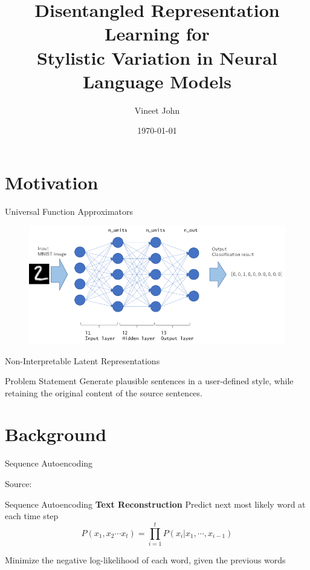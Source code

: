 \documentclass[aspectratio=169]{beamer}
\title{
    Disentangled Representation Learning for \\
    Stylistic Variation in Neural Language Models}
\date{\today}
\author{Vineet John}
\institute{University of Waterloo}
\begin{document}
\maketitle

\graphicspath{{images/}}

\section{Motivation}

\begin{frame}{Universal Function Approximators}
	\begin{figure}[ht]
		\centering
		\includegraphics[width=\linewidth]{mlp-network}
	\end{figure}
\end{frame}

\begin{frame}{Non-Interpretable Latent Representations}
\end{frame}

\begin{frame}{Problem Statement}
	\centering
	\Huge{Generate plausible sentences in a user-defined style, while retaining the original content of the source sentences.}
\end{frame}

% 

\section{Background}

\begin{frame}{Sequence Autoencoding}
	\centering
	

	\tiny{Source: \cite{srivastava2015unsupervised}}
\end{frame}

\begin{frame}{Sequence Autoencoding}
    \textbf{Text Reconstruction}
    Predict next most likely word at each time step
    \begin{equation}
        P(x_1, x_2 \cdots x_t) = \prod_{i=1}^t P(x_i | x_1, \cdots, x_{i-1})
    \end{equation}

    Minimize the negative log-likelihood of each word, given the previous words
\end{frame}
\end{document}
